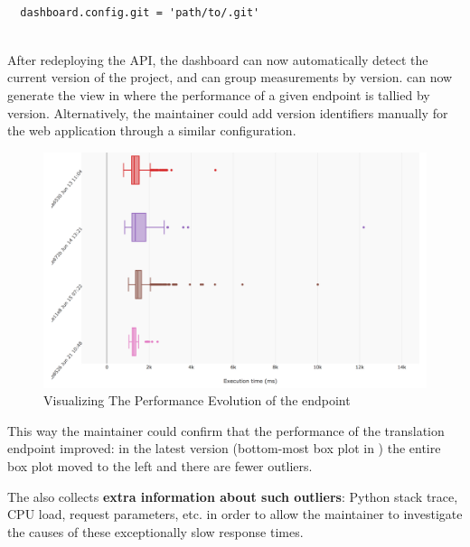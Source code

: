 \documentclass[conference]{IEEEtran}
\begin{document}
%
%
%
    
    \begin{lstlisting}[style=custompython]
  
  dashboard.config.git = 'path/to/.git'
    
  \end{lstlisting}  
 
  After redeploying the API, the dashboard can now automatically detect the current version of the project, and can group measurements by version. \tool can now generate the view in  where the performance of a given endpoint is tallied by version.
  Alternatively, the maintainer could add version identifiers manually for the web application through a similar configuration.
  
    \begin{figure}[h!]
      \centering
      \includegraphics[width=\linewidth]{translation_endpoint_evolution.png}
      \caption{Visualizing The Performance Evolution of the \epTranslations endpoint}
      \label{fig:tee}
    \end{figure}

  This way the maintainer could confirm that the performance of the translation endpoint improved: in the latest version (bottom-most box plot in ) the entire box plot moved to the left and there are fewer outliers.


  \niceseparator

  The \tool also collects {\bf extra information about such outliers}: Python stack trace, CPU load, request parameters, etc. in order to allow the maintainer to investigate the causes of these exceptionally slow response times. 
\end{document}

